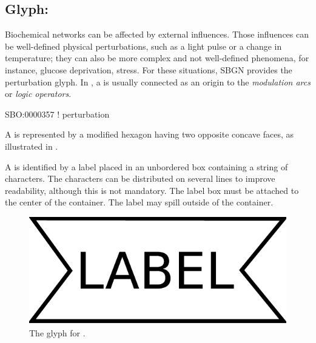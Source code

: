 \subsection{Glyph: }
\label{sec:perturbation}

Biochemical networks can be affected by external influences. Those influences can be well-defined physical perturbations, such as a light pulse or a change in temperature; they can also be more complex and not well-defined phenomena, for instance, glucose deprivation, stress. For these situations, SBGN provides the perturbation glyph. 
 \color{red}
In \SBGNAFLone, a  is usually connected as an origin to the \emph{modulation arcs} or \emph{logic operators}.

\normalcolor



\begin{glyphDescription}

\glyphSboTerm SBO:0000357 ! perturbation

\glyphContainer A  is represented by a modified hexagon
having two opposite concave faces, as illustrated in .

\glyphLabel A  is identified by a label placed in an unbordered box containing a string of characters.  The characters can be distributed on several lines to improve readability, although this is not mandatory.  The label box must be attached to the center of the  container.  The label may spill outside of the container. 

\end{glyphDescription}

\begin{figure}[H]
  \centering
  \includegraphics[scale = 0.3]{images/perturbation}
  \caption{The \AF glyph for .}
  \label{fig:af:perturbation}
\end{figure}
